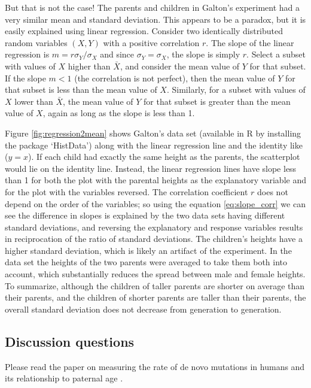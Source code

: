 \documentclass[
]{book}
\theoremstyle{definition}
\theoremstyle{definition}
\theoremstyle{definition}
\theoremstyle{remark}
\begin{document}
But that is not the case! The parents and children in Galton's experiment had a very similar mean and standard deviation. This appears to be a paradox, but it is easily explained using linear regression. Consider two identically distributed random variables \((X,Y)\) with a positive correlation \(r\). The slope of the linear regression is \(m = r \sigma_Y/\sigma_X\) and since \(\sigma_Y=\sigma_X\), the slope is simply \(r\). Select a subset with values of \(X\) higher than \(\bar X\), and consider the mean value of \(Y\) for that subset. If the slope \(m<1\) (the correlation is not perfect), then the mean value of \(Y\) for that subset is less than the mean value of \(X\). Similarly, for a subset with values of \(X\) lower than \(\bar X\), the mean value of \(Y\) for that subset is greater than the mean value of \(X\), again as long as the slope is less than 1.

Figure \ref{fig:regression2mean} shows Galton's data set (available in R by installing the package `HistData') along with the linear regression line and the identity like (\(y=x\)). If each child had exactly the same height as the parents, the scatterplot would lie on the identity line. Instead, the linear regression lines have slope less than 1 for both the plot with the parental heights as the explanatory variable and for the plot with the variables reversed. The correlation coefficient \(r\) does not depend on the order of the variables; so using the equation \ref{eq:slope_corr} we can see the difference in slopes is explained by the two data sets having different standard deviations, and reversing the explanatory and response variables results in reciprocation of the ratio of standard deviations. The children's heights have a higher standard deviation, which is likely an artifact of the experiment. In the data set the heights of the two parents were averaged to take them both into account, which substantially reduces the spread between male and female heights. To summarize, although the children of taller parents are shorter on average than their parents, and the children of shorter parents are taller than their parents, the overall standard deviation does not decrease from generation to generation.

\hypertarget{discussion-questions-1}{%
\subsection{Discussion questions}\label{discussion-questions-1}}

Please read the paper on measuring the rate of  de novo mutations in humans and its relationship to paternal age \citep{kong_rate_2012}.
\end{document}
